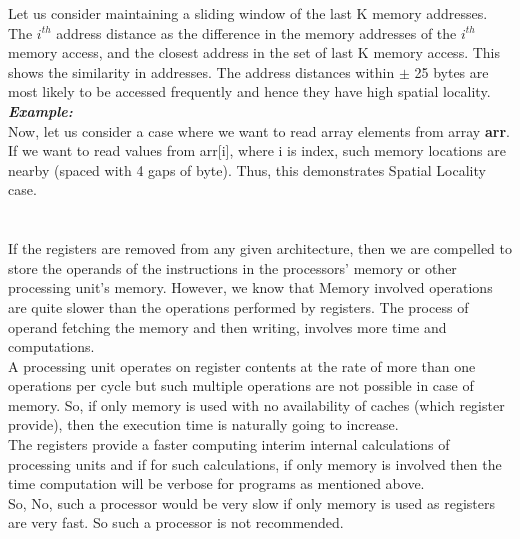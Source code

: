 \documentclass[12pt]{article}
\begin{document}
Let us consider maintaining a sliding window of the last K memory addresses. The $i^{th}$ address distance as the difference in the memory addresses of the $i^{th}$ memory access, and the closest address in the set of last K memory access. This shows the similarity in addresses. The address distances within $\pm$ 25 bytes are most likely to be accessed frequently and hence they have high spatial locality. \\

\textbf{\textit{Example:}} \\

Now, let us consider a case where we want to read array elements from array \textbf{arr}. If we want to read values from arr[i], where i is index, such memory locations are nearby (spaced with 4 gaps of byte). Thus, this demonstrates Spatial Locality case.

\section{}

If the registers are removed from any given architecture, then we are compelled to store the operands of the instructions in the processors' memory or other processing unit's memory. However, we know that Memory involved operations are quite slower than the operations performed by registers. The process of operand fetching the memory and then writing, involves more time and computations. \\

A processing unit operates on register contents at the rate of more than one operations per cycle but such multiple operations are not possible in case of memory. So, if only memory is used with no availability of caches (which register provide), then the execution time is naturally going to increase. \\

The registers provide a faster computing interim internal calculations of processing units and if for such calculations, if only memory is involved then the time computation will be verbose for programs as mentioned above. \\

So, No, such a processor would be very slow if only memory is used as registers are very fast. So such a processor is not recommended. 

\end{document}
